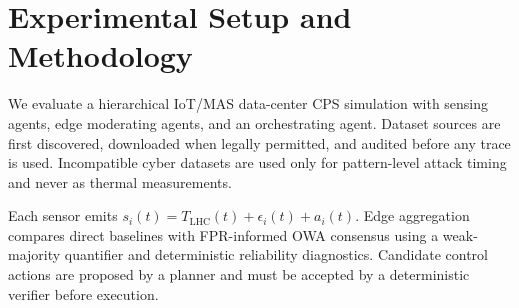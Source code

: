 \section{Experimental Setup and Methodology}
We evaluate a hierarchical IoT/MAS data-center CPS simulation with sensing agents, edge moderating agents, and an orchestrating agent. Dataset sources are first discovered, downloaded when legally permitted, and audited before any trace is used. Incompatible cyber datasets are used only for pattern-level attack timing and never as thermal measurements.

Each sensor emits $s_i(t)=T_{\mathrm{LHC}}(t)+\epsilon_i(t)+a_i(t)$. Edge aggregation compares direct baselines with FPR-informed OWA consensus using a weak-majority quantifier and deterministic reliability diagnostics. Candidate control actions are proposed by a planner and must be accepted by a deterministic verifier before execution.
